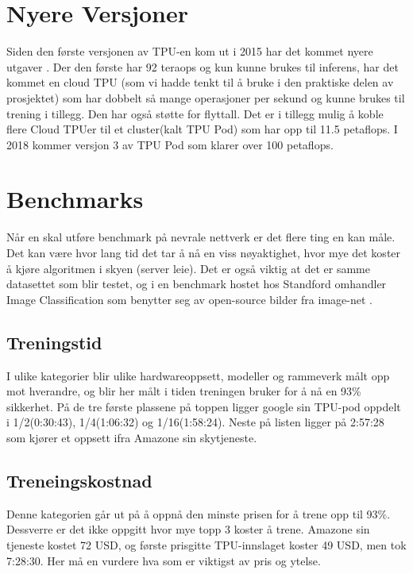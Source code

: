 \newpage
\section{Nyere Versjoner}
Siden den første versjonen av TPU-en kom ut i 2015 har det kommet nyere utgaver \cite{tpu_video}. Der den første har 92 teraops og kun kunne brukes til inferens, har det kommet en cloud TPU (som vi hadde tenkt til å bruke i den praktiske delen av prosjektet) som har dobbelt så mange operasjoner per sekund og kunne brukes til trening i tillegg. Den har også støtte for flyttall. Det er i tillegg mulig å koble flere Cloud TPUer til et cluster(kalt TPU Pod) som har opp til 11.5 petaflops. I 2018 kommer versjon 3 av TPU Pod som klarer over 100 petaflops.

\section{Benchmarks}

Når en skal utføre benchmark på nevrale nettverk er det flere ting en kan måle. Det kan være hvor lang tid det tar å nå en viss nøyaktighet, hvor mye det koster å kjøre algoritmen i skyen (server leie). Det er også viktig at det er samme datasettet som blir testet, og i en benchmark\cite{benchmark} hostet hos Standford omhandler Image Classification som benytter seg av open-source bilder fra image-net \cite{image-net}.

\subsection{Treningstid}
I ulike kategorier blir ulike hardwareoppsett, modeller og rammeverk målt opp mot hverandre, og blir her målt i tiden treningen bruker for å nå en 93\% sikkerhet. På de tre første plassene på toppen ligger google sin TPU-pod oppdelt i 1/2(0:30:43), 1/4(1:06:32) og 1/16(1:58:24). Neste på listen ligger på 2:57:28 som kjører et oppsett ifra Amazone sin skytjeneste. 

\subsection{Treneingskostnad}
Denne kategorien går ut på å oppnå den minste prisen for å trene opp til 93\%. Dessverre er det ikke oppgitt hvor mye topp 3 koster å trene. Amazone sin tjeneste kostet 72 USD, og første prisgitte TPU-innslaget koster 49 USD, men tok 7:28:30. Her må en vurdere hva som er viktigst av pris og ytelse.

